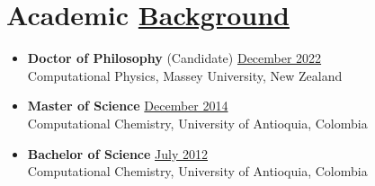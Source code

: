 \section{Academic \href{.}{Background}}

\begin{itemize}
    \itemsep-1mm
    \item {\bf Doctor of Philosophy} (Candidate)\hfill
          \href{.}{December 2022}\\
          Computational Physics, Massey University, New Zealand
    \item {\bf Master of Science}\hfill
          \href{.}{December 2014}\\
          Computational Chemistry, University of Antioquia, Colombia
    \item {\bf Bachelor of Science}\hfill
          \href{.}{July 2012}\\
          Computational Chemistry, University of Antioquia, Colombia
\end{itemize}